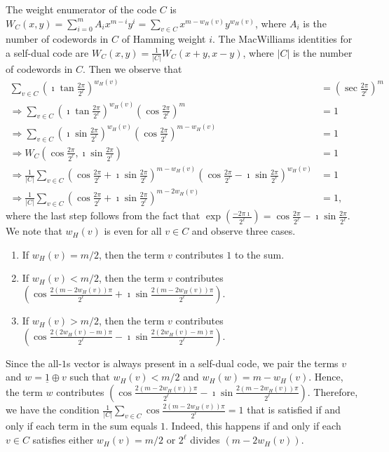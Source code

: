 \documentclass[twoside,romanappendices]{IEEEtran}
\newcommand{\vecnot}[1]{\underline{#1}}
\begin{document}
The weight enumerator of the code $C$ is $W_C(x,y) = \sum_{i=0}^{m} A_i x^{m-i} y^i = \sum_{v \in C} x^{m - w_H(v)} y^{w_H(v)}$, where $A_i$ is the number of codewords in $C$ of Hamming weight $i$.
The MacWilliams identities for a self-dual code are $W_C(x,y) = \frac{1}{|C|} W_C(x+y, x-y)$, where $|C|$ is the number of codewords in $C$.
Then we observe that
\begin{align}
\sum_{v \in C} \left( \imath \tan\frac{2\pi}{2^{\ell}} \right)^{w_H(v)} & = \left( \sec\frac{2\pi}{2^{\ell}} \right)^{m} \\
%
\Rightarrow \sum_{v \in C} \left( \imath \tan\frac{2\pi}{2^{\ell}} \right)^{w_H(v)} \left( \cos\frac{2\pi}{2^{\ell}} \right)^{m} & = 1 \\
%
\Rightarrow \sum_{v \in C} \left( \imath \sin\frac{2\pi}{2^{\ell}} \right)^{w_H(v)} \left( \cos\frac{2\pi}{2^{\ell}} \right)^{m - w_H(v)} & = 1 \\
%
\Rightarrow W_C\left( \cos\frac{2\pi}{2^{\ell}}, \imath\sin\frac{2\pi}{2^{\ell}} \right) & = 1 \\
%
\Rightarrow \frac{1}{|C|} \sum_{v \in C} \left( \cos\frac{2\pi}{2^{\ell}} + \imath \sin\frac{2\pi}{2^{\ell}} \right)^{m - w_H(v)} \left( \cos\frac{2\pi}{2^{\ell}} - \imath \sin\frac{2\pi}{2^{\ell}} \right)^{w_H(v)} & = 1 \\
%
\Rightarrow \frac{1}{|C|} \sum_{v \in C} \left( \cos\frac{2\pi}{2^{\ell}} + \imath \sin\frac{2\pi}{2^{\ell}} \right)^{m - 2w_H(v)} & = 1,
\end{align}
where the last step follows from the fact that $\exp\left( \frac{-2\pi\imath}{2^{\ell}} \right) = \cos\frac{2\pi}{2^{\ell}} - \imath \sin\frac{2\pi}{2^{\ell}}$.
We note that $w_H(v)$ is even for all $v \in C$ and observe three cases.
\begin{enumerate}

\item If $w_H(v) = m/2$, then the term $v$ contributes $1$ to the sum.

\item If $w_H(v) < m/2$, then the term $v$ contributes $\left( \cos\frac{2 (m - 2 w_H(v)) \pi}{2^{\ell}} + \imath \sin\frac{2 (m - 2 w_H(v)) \pi}{2^{\ell}} \right)$.

\item If $w_H(v) > m/2$, then the term $v$ contributes $\left( \cos\frac{2 (2 w_H(v) - m) \pi}{2^{\ell}} - \imath \sin\frac{2 (2 w_H(v) - m) \pi}{2^{\ell}} \right)$.

\end{enumerate}
Since the all-$1$s vector is always present in a self-dual code, we pair the terms $v$ and $w = \vecnot{1} \oplus v$ such that $w_H(v) < m/2$ and $w_H(w) = m - w_H(v)$.
Hence, the term $w$ contributes $\left( \cos\frac{2 (m - 2 w_H(v)) \pi}{2^{\ell}} - \imath \sin\frac{2 (m - 2 w_H(v)) \pi}{2^{\ell}} \right)$.
Therefore, we have the condition $\frac{1}{|C|} \sum_{v \in C} \cos\frac{2 (m - 2 w_H(v)) \pi}{2^{\ell}} = 1$ that is satisfied if and only if each term in the sum equals $1$. 
Indeed, this happens if and only if each $v \in C$ satisfies either $w_H(v) = m/2$ or $2^{\ell}$ divides $(m - 2 w_H(v))$.   \hfill \IEEEQEDhere
\end{document}
